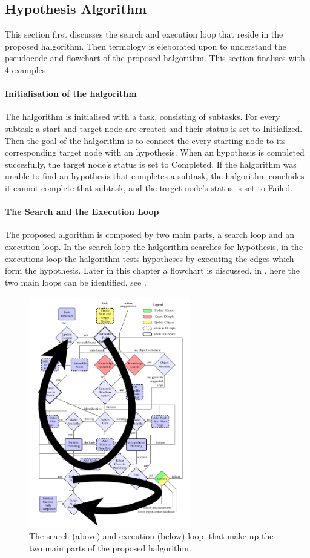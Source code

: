 \subsection{Hypothesis Algorithm}%
\label{subsec:halgorithm}
This section first discusses the search and execution loop that reside in the proposed \ac{halgorithm}. Then termology is eleborated upon to understand the pseudocode and flowchart of the proposed \ac{halgorithm}. This section finalises with 4 examples.\bs

\paragraph{Initialisation of the \ac{halgorithm}}
The \ac{halgorithm} is initialised with a task, consisting of subtasks. For every subtask a start and target node are created and their status is set to Initialized. Then the goal of the \ac{halgorithm} is to connect the every starting node to its corresponding target node with an hypothesis. When an hypothesis is completed succesfully, the target node's status is set to Completed. If the \ac{halgorithm} was unable to find an hypothesis that completes a subtask, the \ac{halgorithm} concludes it cannot complete that subtask, and the target node's status is set to Failed.\bs


\paragraph{The Search and the Execution Loop}
The proposed algorithm is composed by two main parts, a search loop and an execution loop. In the search loop the \ac{halgorithm} searches for hypothesis, in the executions loop the \ac{halgorithm} tests hypotheses by executing the edges which form the hypothesis. Later in this chapter a flowchart is discussed, in , here the two main loops can be identified, see .\bs
\begin{figure}[H]
    \centering
    \includegraphics[width=7cm]{figures/proposed_method/two_loops_identified}
    \caption{The search (above) and execution (below) loop, that make up the two main parts of the proposed \ac{halgorithm}.}%
    \label{fig:two_loops_identified}
\end{figure}



